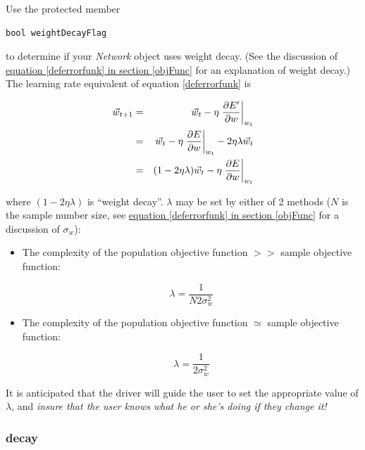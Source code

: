 \documentclass{report}
\newcommand{\D}[2]{\frac{\partial #1}{\partial #2}}
\begin{document}
Use the protected member

\begin{verbatim}
bool weightDecayFlag
\end{verbatim}

to determine if your {\em Network} object uses weight decay.  (See the
discussion of \hyperref[deferrorfunk]{equation \ref{deferrorfunk} in
section \ref{objFunc}} for an explanation of weight decay.)  The
learning rate equivalent of equation \ref{deferrorfunk} is

\begin{eqnarray*}\index{Weight decay}
\vec w_{t+1} & = & \vec w_t - \eta \left. \D{E'}w \right|_{w_t} \\
& = & \vec w_t - \eta \left. \D{E}w \right|_{w_t} - 2\eta\lambda\vec
w_t \\
& = & (1-2\eta\lambda)\vec w_t - \eta \left. \D{E}w \right|_{w_t}
\end{eqnarray*}

where $(1-2\eta\lambda)$ is ``weight decay''.
$\lambda$ may be set by either of 2 methods ($N$ is the sample number
size, see \hyperref[objFunc]{equation \ref{deferrorfunk} in section
\ref{objFunc}} for a discussion of $\sigma_w$):

\begin{itemize}

\item The complexity of the population objective function $>>$ sample
objective function:

\begin{equation}
\lambda = \frac 1{N2\sigma_w^2}
\end{equation}

\item The complexity of the population objective function $\simeq$
sample objective function:

\begin{equation}
\lambda = \frac 1{2\sigma_w^2}
\end{equation}

\end{itemize}

It is anticipated that the driver will guide the user to set the
appropriate value of $\lambda$, and {\em insure that the user knows
what he or she's doing if they change it!}

\subsubsection{decay}
\end{document}
